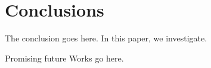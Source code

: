 \documentclass[conference]{IEEEtran}
\begin{document}
\section{Conclusions} \label{conclusion}
The conclusion goes here. In this paper, we investigate.

Promising future Works go here.












\end{document}
